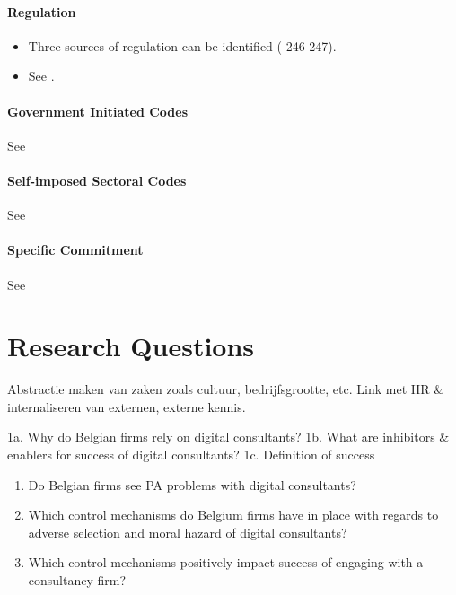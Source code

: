 \documentclass[12pt]{article}
\providecommand{\tightlist}{%
  \setlength{\itemsep}{0pt}\setlength{\parskip}{0pt}}
\begin{document}
\hypertarget{regulation}{%
\paragraph{Regulation}\label{regulation}}

\begin{itemize}
\tightlist
\item
  Three sources of regulation can be identified (\citet{clark1993}
  246-247).
\item
  See \citet[813-817]{muzio2011}.
\end{itemize}

\hypertarget{government-initiated-codes}{%
\paragraph{Government Initiated
Codes}\label{government-initiated-codes}}

See \citet[3-4]{sturdy2021}

\hypertarget{self-imposed-sectoral-codes}{%
\paragraph{Self-imposed Sectoral
Codes}\label{self-imposed-sectoral-codes}}

See \citet[4]{sturdy2021}

\hypertarget{specific-commitment}{%
\paragraph{Specific Commitment}\label{specific-commitment}}

See \citet[12]{sturdy2021}

\hypertarget{research-questions}{%
\section{Research Questions}\label{research-questions}}

Abstractie maken van zaken zoals cultuur, bedrijfsgrootte, etc. Link met
HR \& internaliseren van externen, externe kennis.

1a. Why do Belgian firms rely on digital consultants? 1b. What are
inhibitors \& enablers for success of digital consultants? 1c.
Definition of success

\begin{enumerate}
\def\labelenumi{\arabic{enumi}.}
\setcounter{enumi}{1}
\tightlist
\item
  Do Belgian firms see PA problems with digital consultants?
\item
  Which control mechanisms do Belgium firms have in place with regards
  to adverse selection and moral hazard of digital consultants?
\item
  Which control mechanisms positively impact success of engaging with a
  consultancy firm?
\end{enumerate}
\end{document}
